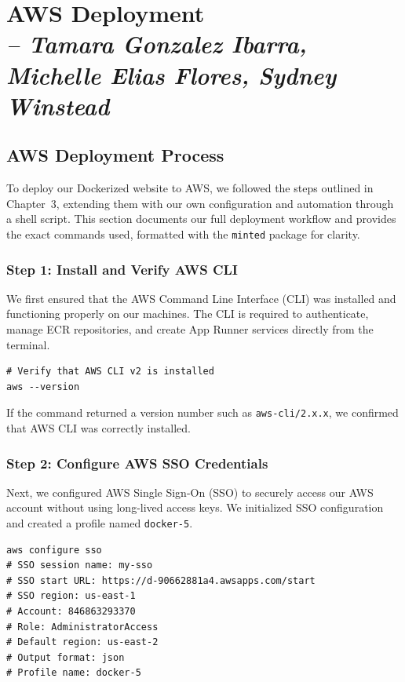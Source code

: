 \chapter{AWS Deployment \\
\small{\textit{-- Tamara Gonzalez Ibarra, Michelle Elias Flores, Sydney Winstead}}
\label{Chapter::itAWSDeployment}}

\section{AWS Deployment Process}

To deploy our Dockerized website to AWS, we followed the steps outlined in Chapter~3, extending them with our own configuration and automation through a shell script. This section documents our full deployment workflow and provides the exact commands used, formatted with the \texttt{minted} package for clarity.

\subsection{Step 1: Install and Verify AWS CLI}

We first ensured that the AWS Command Line Interface (CLI) was installed and functioning properly on our machines. The CLI is required to authenticate, manage ECR repositories, and create App Runner services directly from the terminal.

\begin{verbatim}
# Verify that AWS CLI v2 is installed
aws --version
\end{verbatim}

If the command returned a version number such as \texttt{aws-cli/2.x.x}, we confirmed that AWS CLI was correctly installed.

\subsection{Step 2: Configure AWS SSO Credentials}

Next, we configured AWS Single Sign-On (SSO) to securely access our AWS account without using long-lived access keys. We initialized SSO configuration and created a profile named \texttt{docker-5}.

\begin{verbatim}
aws configure sso
# SSO session name: my-sso
# SSO start URL: https://d-90662881a4.awsapps.com/start
# SSO region: us-east-1
# Account: 846863293370
# Role: AdministratorAccess
# Default region: us-east-2
# Output format: json
# Profile name: docker-5
\end{verbatim}


